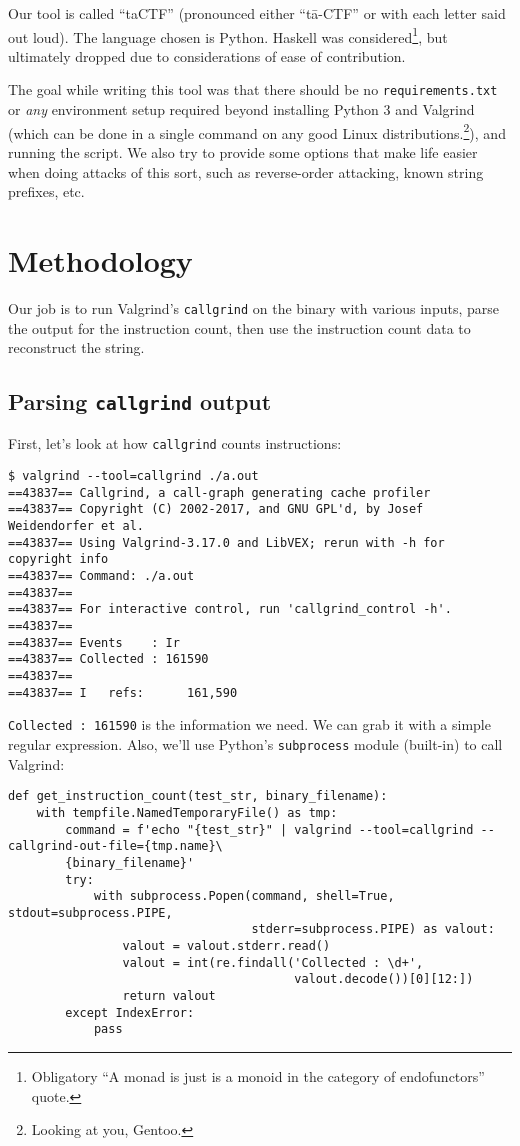 \documentclass[11pt]{article}
\begin{document}
Our tool is called ``taCTF'' (pronounced either ``tā-CTF'' or with each
letter said out loud). The language chosen is Python. Haskell was
considered\footnote{Obligatory ``A monad is just is a monoid in the category of endofunctors'' quote.}, but ultimately dropped due to considerations of ease of
contribution.

The goal while writing this tool was that there should be no
\texttt{requirements.txt} or \emph{any} environment setup required beyond
installing Python 3 and Valgrind (which can be done in a single
command on any good Linux distributions.\footnote{Looking at you, Gentoo.}), and running the
script. We also try to provide some options that make life easier when
doing attacks of this sort, such as reverse-order attacking, known
string prefixes, etc.

\section{Methodology}
\label{sec:orga7dfff8}

Our job is to run Valgrind's \texttt{callgrind} on the binary with various
inputs, parse the output for the instruction count, then use the
instruction count data to reconstruct the string.

\subsection{Parsing \texttt{callgrind} output}
\label{sec:org4aa5f6f}

First, let's look at how \texttt{callgrind} counts instructions:

\begin{verbatim}
$ valgrind --tool=callgrind ./a.out
==43837== Callgrind, a call-graph generating cache profiler
==43837== Copyright (C) 2002-2017, and GNU GPL'd, by Josef Weidendorfer et al.
==43837== Using Valgrind-3.17.0 and LibVEX; rerun with -h for copyright info
==43837== Command: ./a.out
==43837==
==43837== For interactive control, run 'callgrind_control -h'.
==43837==
==43837== Events    : Ir
==43837== Collected : 161590
==43837==
==43837== I   refs:      161,590
\end{verbatim}

\texttt{Collected : 161590} is the information we need. We can grab it with a
simple regular expression. Also, we'll use Python's \texttt{subprocess}
module (built-in) to call Valgrind:
\begin{verbatim}
def get_instruction_count(test_str, binary_filename):
    with tempfile.NamedTemporaryFile() as tmp:
        command = f'echo "{test_str}" | valgrind --tool=callgrind --callgrind-out-file={tmp.name}\
        {binary_filename}'
        try:
            with subprocess.Popen(command, shell=True, stdout=subprocess.PIPE,
                                  stderr=subprocess.PIPE) as valout:
                valout = valout.stderr.read()
                valout = int(re.findall('Collected : \d+',
                                        valout.decode())[0][12:])
                return valout
        except IndexError:
            pass
\end{verbatim}
\end{document}
